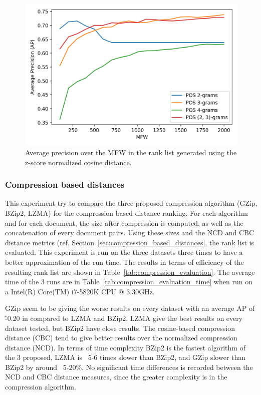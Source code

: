 \begin{figure}
  \centering
  \caption{Average precision over the MFW in the rank list generated using the z-score normalized cosine distance.}
  \label{fig:pos_ngrams}
  \includegraphics[width=\linewidth]{img/pos_ngrams.png}
\end{figure}

\subsubsection{Compression based distances}

This experiment try to compare the three proposed compression algorithm (GZip, BZip2, LZMA) for the compression based distance ranking.
For each algorithm and for each document, the size after compression is computed, as well as the concatenation of every document pairs.
Using these sizes and the NCD and CBC distance metrics (ref. Section~\ref{sec:compression_based_distances}, the rank list is evaluated.
This experiment is run on the three datasets three times to have a better approximation of the run time.
The results in terms of efficiency of the resulting rank list are shown in Table~\ref{tab:compression_evaluation}.
The average time of the 3 runs are in Table~\ref{tab:compression_evaluation_time} when run on a Intel(R) Core(TM) i7-5820K CPU @ 3.30GHz.

GZip seem to be giving the worse results on every dataset with an average AP of \~-0.20 in compared to LZMA and BZip2.
LZMA give the best results on every dataset tested, but BZip2 have close results.
The cosine-based compression distance (CBC) tend to give better results over the normalized compression distance (NCD).
In terms of time complexity BZip2 is the fastest algorithm of the 3 proposed, LZMA is ~5-6 times slower than BZip2, and GZip slower than BZip2 by around ~5-20\%.
No significant time differences is recorded between the NCD and CBC distance measures, since the greater complexity is in the compression algorithm.

